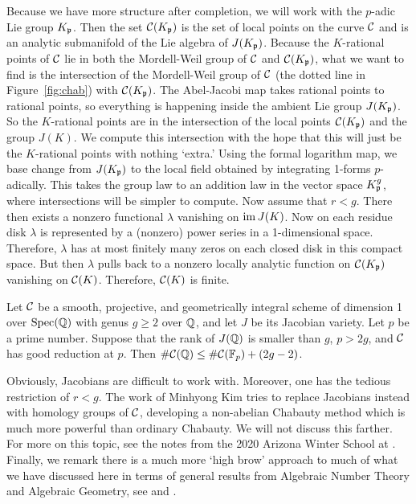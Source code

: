 Because we have more structure after completion, we will work with the $p$-adic Lie group $K_{\mathfrak{p}}$. Then the set $\mathcal{C}(K_{\mathfrak{p}})$ is the set of local points on the curve $\mathcal{C}$ and is an analytic submanifold of the Lie algebra of $J(K_{\mathfrak{p}})$. Because the $K$-rational points of $\mathcal{C}$ lie in both the Mordell-Weil group of $\mathcal{C}$ and $\mathcal{C}(K_{\mathfrak{p}})$, what we want to find is the intersection of the Mordell-Weil group of $\mathcal{C}$ (the dotted line in Figure~\ref{fig:chab}) with $\mathcal{C}(K_{\mathfrak{p}})$. The Abel-Jacobi map takes rational points to rational points, so everything is happening inside the ambient Lie group $J(K_{\mathfrak{p}})$. So the $K$-rational points are in the intersection of the local points $\mathcal{C}(K_{\mathfrak{p}})$ and the group $J(K)$. We compute this intersection with the hope that this will just be the $K$-rational points with nothing `extra.' Using the formal logarithm map, we base change from $J(K_{\mathfrak{p}})$ to the local field obtained by integrating 1-forms $p$-adically. This takes the group law to an addition law in the vector space $K_{\mathfrak{p}}^g$, where intersections will be simpler to compute. Now assume that $r < g$. There then exists a nonzero functional $\lambda$ vanishing on $\operatorname{im} J(K)$. Now on each residue disk $\lambda$ is represented by a (nonzero) power series in a 1-dimensional space. Therefore, $\lambda$ has at most finitely many zeros on each closed disk in this compact space. But then $\lambda$ pulls back to a nonzero locally analytic function on $\mathcal{C}(K_{\mathfrak{p}})$ vanishing on $\mathcal{C}(K)$. Therefore, $\mathcal{C}(K)$ is finite. 


\begin{thm}
Let $\mathcal{C}$ be a smooth, projective, and geometrically integral scheme of dimension 1 over $\operatorname{Spec}(\mathbb{Q})$ with genus $g \geq 2$ over $\mathbb{Q}$, and let $J$ be its Jacobian variety. Let $p$ be a prime number. Suppose that the rank of $J(\mathbb{Q})$ is smaller than $g$, $p > 2g$, and $\mathcal{C}$ has good reduction at $p$. Then $\#\mathcal{C}(\mathbb{Q}) \leq \#\mathcal{C}(\mathbb{F}_p) + (2g - 2)$.
\end{thm}


Obviously, Jacobians are difficult to work with. Moreover, one has the tedious restriction of $r < g$. The work of Minhyong Kim tries to replace Jacobians instead with homology groups of $\mathcal{C}$, developing a non-abelian Chabauty method which is much more powerful than ordinary Chabauty. We will not discuss this farther. For more on this topic, see the notes from the 2020 Arizona Winter School at \cite{arizona}. Finally, we remark there is a much more `high brow' approach to much of what we have discussed here in terms of general results from Algebraic Number Theory and Algebraic Geometry, see \cite{hindrysilverman00} and \cite{poonen17}.





